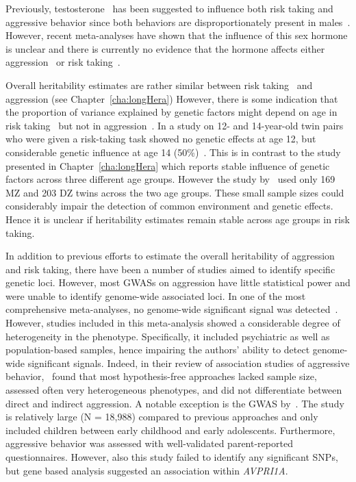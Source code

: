 Previously, testosterone~\cite{Vermeersch2008} has been suggested to influence both risk taking and aggressive behavior since both behaviors are disproportionately present in males~\cite{Byrnes1999}.
However, recent meta-analyses have shown that  the influence of this sex hormone is unclear and there is currently no evidence that the hormone affects either aggression~\cite{Archer2005a} or risk taking~\cite{Vermeersch2008}.

Overall heritability estimates are rather similar between risk taking~\cite{Anokhin2009} and aggression (see Chapter~\ref{cha:longHera})
However, there is some indication that the proportion of variance explained by genetic factors might depend on age in risk taking~\cite{Anokhin2009} but not in aggression~\cite{Porsch2016}.
In a study on 12- and 14-year-old twin pairs who were given a risk-taking task showed no genetic effects at age 12, but considerable genetic influence at age 14 (50\%)~\cite{Anokhin2009}.
This is in contrast to the study presented in Chapter~\ref{cha:longHera} which reports stable influence of genetic factors across three different age groups.
However the study by~\citet{Anokhin2009} used only 169 MZ and 203 DZ twins across the two age groups.
These small sample sizes could considerably impair the detection of common environment and genetic effects. 
Hence it is unclear if heritability estimates remain stable across age groups in risk taking.

In addition to previous efforts to estimate the overall heritability of aggression and risk taking, there have been a number of studies aimed to identify specific genetic loci.
However, most GWASs on aggression have little statistical power and were unable to identify genome-wide associated loci.
In one of the most comprehensive meta-analyses, no genome-wide significant signal was detected~\citet{Vassos2014}.
However, studies included in this meta-analysis showed a considerable degree of heterogeneity in the phenotype.
Specifically, it included psychiatric as well as population-based samples, hence impairing the authors' ability to detect genome-wide significant signals.
Indeed, in their review of association studies of aggressive behavior,~\citet{Fernandez-Castillo2016} found that most hypothesis-free approaches lacked sample size, assessed often very heterogeneous phenotypes, and did not differentiate between direct and indirect aggression. 
A notable exception is the GWAS by~\citet{Pappa2016a}.
The study is relatively large (N = 18,988) compared to previous approaches and only included children between early childhood and early adolescents.
Furthermore, aggressive behavior was assessed with well-validated parent-reported questionnaires. 
However, also this study failed to identify any significant SNPs, but gene based analysis suggested an association within \textit{AVPRI1A}.

